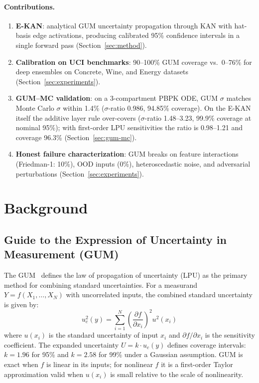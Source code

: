\documentclass{article}
\begin{document}
\paragraph{Contributions.}
\begin{enumerate}
  \item \textbf{E-KAN}: analytical GUM uncertainty propagation through KAN
        with hat-basis edge activations, producing calibrated 95\% confidence
        intervals in a single forward pass (Section~\ref{sec:method}).
  \item \textbf{Calibration on UCI benchmarks}: 90--100\% GUM coverage vs.\
        0--76\% for deep ensembles on Concrete, Wine, and Energy datasets
        (Section~\ref{sec:experiments}).
  \item \textbf{GUM--MC validation}: on a 3-compartment PBPK ODE, GUM
        $\sigma$ matches Monte Carlo $\sigma$ within 1.4\% ($\sigma$-ratio
        0.986, 94.85\% coverage).  On the E-KAN itself the additive layer
        rule over-covers ($\sigma$-ratio 1.48--3.23, 99.9\% coverage at
        nominal 95\%); with first-order LPU sensitivities the ratio is
        0.98--1.21 and coverage 96.3\% (Section~\ref{sec:gum-mc}).
  \item \textbf{Honest failure characterization}: GUM breaks on feature
        interactions (Friedman-1: 10\%), OOD inputs (0\%), heteroscedastic
        noise, and adversarial perturbations (Section~\ref{sec:experiments}).
\end{enumerate}

\section{Background}
\label{sec:background}

\subsection{Guide to the Expression of Uncertainty in Measurement (GUM)}
\label{sec:gum}

The GUM~\citep{gum2008} defines the law of propagation of uncertainty (LPU)
as the primary method for combining standard uncertainties.  For a measurand
$Y = f(X_1, \ldots, X_N)$ with uncorrelated inputs, the combined standard
uncertainty is given by:
\begin{equation}
  u_c^2(y) = \sum_{i=1}^{N} \left(\frac{\partial f}{\partial x_i}\right)^2 u^2(x_i)
  \label{eq:lpu}
\end{equation}
where $u(x_i)$ is the standard uncertainty of input $x_i$ and
$\partial f / \partial x_i$ is the sensitivity coefficient.  The expanded
uncertainty $U = k \cdot u_c(y)$ defines coverage intervals: $k=1.96$ for
95\% and $k=2.58$ for 99\% under a Gaussian assumption.  GUM is exact when
$f$ is linear in its inputs; for nonlinear $f$ it is a first-order Taylor
approximation valid when $u(x_i)$ is small relative to the scale of
nonlinearity.
\end{document}
